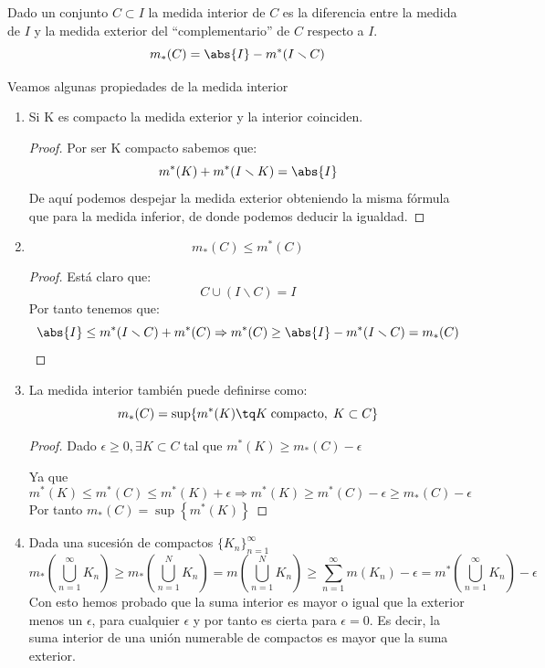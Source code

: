 \documentclass{apuntes}
\begin{document}
\begin{defn}
Dado un conjunto $C \subset I$ la medida interior de $C$ es la diferencia entre la medida de $I$ y la medida exterior del ``complementario'' de $C$ respecto a $I$.
\[m_*(C) = \abs{I} - m^*(I \smallsetminus C)\]
\end{defn}

Veamos algunas propiedades de la medida interior
\begin{enumerate}
%
\item Si K es compacto la medida exterior y la interior coinciden.
\begin{proof}
Por ser K compacto sabemos que:
\[m^*(K) + m^*(I\smallsetminus K) = \abs{I}\]
De aquí podemos despejar la medida exterior obteniendo la misma fórmula que para la medida inferior, de donde podemos deducir la igualdad.
\end{proof}

%
\item \[m_*(C) \leq m^*(C)\]
\begin{proof}
Está claro que:
\[C \cup (I \smallsetminus C) = I\]
Por tanto tenemos que:
\[\abs{I} \leq m^*(I \smallsetminus C) + m^*(C) \Rightarrow m^*(C) \geq \abs{I} - m^*(I \smallsetminus C) = m_*(C)\]
\end{proof}

%
\item La medida interior también puede definirse como:
\[m_*(C) = \sup \lbrace  m^*(K) \tq  K\;\text{compacto},\; K \subset C \rbrace \]

\begin{proof}
Dado $\epsilon \geq 0, \exists K \subset C$ tal que $m^*(K) \geq m_*(C) - \epsilon$

Ya que
\[m^*(K) \leq m^*(C) \leq m^*(K) + \epsilon
\Rightarrow m^{*}(K) \geq m^*(C) - \epsilon \geq m_*(C) - \epsilon\]
Por tanto $m_*(C) = \sup\left\{m^*(K)\right\}$
\end{proof}

%
\item Dada una sucesión de compactos $\lbrace K_n \rbrace_{n=1}^{\infty}$
\[m_*(\bigcup_{n=1}^{\infty}K_n) \geq m_*(\bigcup_{n=1}^{N}K_n)= m(\bigcup_{n=1}^{N}K_n) \geq \sum_{n=1}^{\infty}m(K_n)-\epsilon = m^*(\bigcup_{n=1}^{\infty}K_n) - \epsilon\]
Con esto hemos probado que la suma interior es mayor o igual que la exterior menos un $\epsilon$, para cualquier $\epsilon$ y por tanto es cierta para $\epsilon = 0$. Es decir, la suma interior de una unión numerable de compactos es mayor que la suma exterior.


\end{enumerate}
\end{document}

